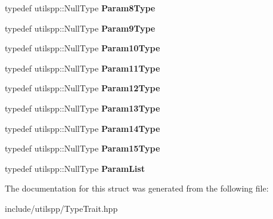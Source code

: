 \begin{DoxyCompactItemize}
\item 
\hypertarget{structutilspp_1_1PointerOnFunction_aa5a5c655341d2d588995eabe60cd109a}{typedef utilspp\-::\-Null\-Type {\bfseries Param8\-Type}}\label{structutilspp_1_1PointerOnFunction_aa5a5c655341d2d588995eabe60cd109a}

\item 
\hypertarget{structutilspp_1_1PointerOnFunction_a08a297c4031e3d9c20532d5bddfacc17}{typedef utilspp\-::\-Null\-Type {\bfseries Param9\-Type}}\label{structutilspp_1_1PointerOnFunction_a08a297c4031e3d9c20532d5bddfacc17}

\item 
\hypertarget{structutilspp_1_1PointerOnFunction_a8c4bb2261f80a482412faadad91a9e1d}{typedef utilspp\-::\-Null\-Type {\bfseries Param10\-Type}}\label{structutilspp_1_1PointerOnFunction_a8c4bb2261f80a482412faadad91a9e1d}

\item 
\hypertarget{structutilspp_1_1PointerOnFunction_aa5537b15c32bae169205172df0b10180}{typedef utilspp\-::\-Null\-Type {\bfseries Param11\-Type}}\label{structutilspp_1_1PointerOnFunction_aa5537b15c32bae169205172df0b10180}

\item 
\hypertarget{structutilspp_1_1PointerOnFunction_a64f16a2ca1e4ad0170363086801b4b4e}{typedef utilspp\-::\-Null\-Type {\bfseries Param12\-Type}}\label{structutilspp_1_1PointerOnFunction_a64f16a2ca1e4ad0170363086801b4b4e}

\item 
\hypertarget{structutilspp_1_1PointerOnFunction_a296b3a16e88aa24439c2b7e9e205014e}{typedef utilspp\-::\-Null\-Type {\bfseries Param13\-Type}}\label{structutilspp_1_1PointerOnFunction_a296b3a16e88aa24439c2b7e9e205014e}

\item 
\hypertarget{structutilspp_1_1PointerOnFunction_a3b7cd9e5b48e7891ff6b0cda7feece26}{typedef utilspp\-::\-Null\-Type {\bfseries Param14\-Type}}\label{structutilspp_1_1PointerOnFunction_a3b7cd9e5b48e7891ff6b0cda7feece26}

\item 
\hypertarget{structutilspp_1_1PointerOnFunction_a314b203219bf124c466dc71a649fa25c}{typedef utilspp\-::\-Null\-Type {\bfseries Param15\-Type}}\label{structutilspp_1_1PointerOnFunction_a314b203219bf124c466dc71a649fa25c}

\item 
\hypertarget{structutilspp_1_1PointerOnFunction_a436c2dacc1f004c340512fca84c272d9}{typedef utilspp\-::\-Null\-Type {\bfseries Param\-List}}\label{structutilspp_1_1PointerOnFunction_a436c2dacc1f004c340512fca84c272d9}

\end{DoxyCompactItemize}


The documentation for this struct was generated from the following file\-:\begin{DoxyCompactItemize}
\item 
include/utilspp/Type\-Trait.\-hpp\end{DoxyCompactItemize}
